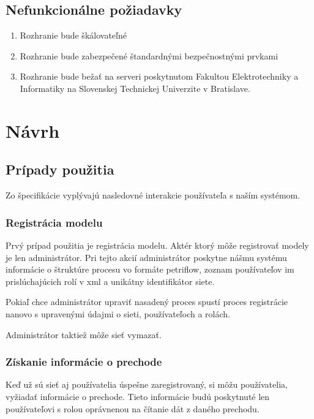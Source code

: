 \subsection{Nefunkcionálne požiadavky}  
\begin{enumerate}  
	
	\item Rozhranie bude škálovateľné  
	
	\item Rozhranie bude zabezpečené štandardnými bezpečnostnými prvkami 

	\item Rozhranie bude bežať na serveri poskytnutom Fakultou Elektrotechniky a Informatiky na Slovenskej Technickej Univerzite v Bratislave.   
	
\end{enumerate}  



\section{Návrh}  




\subsection{Prípady použitia} 
Zo špecifikácie vyplývajú nasledovné interakcie používateľa s naším systémom. 


\subsubsection{Registrácia modelu} 
Prvý prípad použitia je registrácia modelu. Aktér ktorý môže registrovať modely je len administrátor. Pri tejto akcií administrátor poskytne nášmu systému informácie o štruktúre procesu vo formáte petriflow, zoznam používateľov im prislúchajúcich rolí v \acrshort{xml} a unikátny identifikátor siete.  

Pokiaľ chce administrátor upraviť nasadený proces spustí proces registrácie nanovo s upravenými údajmi o sieti, používateľoch a rolách. 

Administrátor taktiež môže sieť vymazať. 


\subsubsection{Získanie informácie o prechode} 
Keď už sú sieť aj používatelia úspešne zaregistrovaný, si môžu používatelia, vyžiadať informácie o prechode. Tieto informácie budú poskytnuté len používateľovi s rolou oprávnenou na čítanie dát z daného prechodu. 

